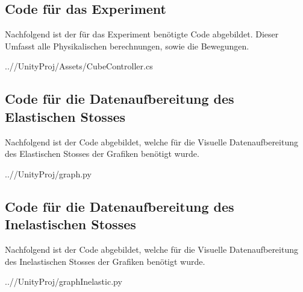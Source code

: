 \documentclass[../main.tex]{subfiles}
\begin{document}
    \subsection{Code für das Experiment}
    Nachfolgend ist der für das Experiment benötigte Code abgebildet.
    Dieser Umfasst alle Physikalischen berechnungen, sowie die Bewegungen.

%    
    \begin{lstinputlisting}[label={lst:CubeController}]
        {..//UnityProj/Assets/CubeController.cs}
    \end{lstinputlisting}

    \subsection{Code für die Datenaufbereitung des Elastischen Stosses}
    Nachfolgend ist der Code abgebildet, welche für die Visuelle Datenaufbereitung des Elastischen Stosses
    der Grafiken benötigt wurde.
    \begin{lstinputlisting}[label={lst:Elastischen}]
    {..//UnityProj/graph.py}
    \end{lstinputlisting}

    \subsection{Code für die Datenaufbereitung des Inelastischen Stosses}
    Nachfolgend ist der Code abgebildet, welche für die Visuelle Datenaufbereitung des Inelastischen Stosses
    der Grafiken benötigt wurde.
    \begin{lstinputlisting}[label={lst:graphInelastic}]
        {..//UnityProj/graphInelastic.py}
    \end{lstinputlisting}
\end{document}
